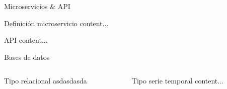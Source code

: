 \documentclass[aspectratio=169,xcolor=dvipsnames]{beamer}
\begin{document}
	\begin{frame}{Microservicios \& API}
		\begin{exampleblock}{Definición microservicio}
			content...
		\end{exampleblock}
		
		\begin{alertblock}{API}
			content...
		\end{alertblock}
	\end{frame}

	
	\begin{frame}{Bases de datos}
		\begin{columns}
			\begin{column}{0.5\textwidth}
				\begin{block}{Tipo relacional}
					asdasdasda
				\end{block}
			\end{column}
			
			
			\begin{column}{0.5\textwidth}
				\begin{block}{Tipo serie temporal}
					content...
				\end{block}
			\end{column}
		\end{columns}
	\end{frame}
	
	
\end{document}
